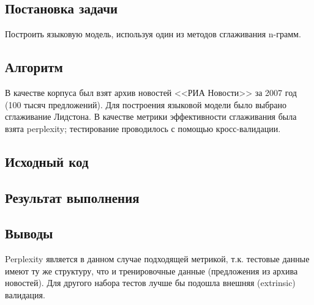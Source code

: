 \documentclass[a4paper, 12pt]{article}
\begin{document}

\newpage


\subsection*{Постановка задачи}
Построить языковую модель, используя один из методов сглаживания n-грамм.

\subsection*{Алгоритм}
В качестве корпуса был взят архив новостей <<РИА Новости>> за 2007 год (100 тысяч предложений). Для построения языковой модели было выбрано сглаживание Лидстона. В качестве метрики эффективности сглаживания была взята perplexity; тестирование проводилось с помощью кросс-валидации.

\subsection*{Исходный код}


\subsection*{Результат выполнения}


\subsection*{Выводы}
Perplexity является в данном случае подходящей метрикой, т.к. тестовые данные имеют ту же структуру, что и тренировочные данные (предложения из архива новостей). Для другого набора тестов лучше бы подошла внешняя (extrinsic) валидация.
\end{document}

